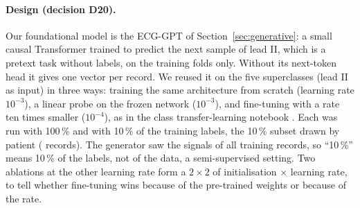 \paragraph{Design (decision D20).} Our foundational model is the ECG-GPT of Section~\ref{sec:generative}:
a small causal Transformer trained to predict the next sample of lead II, which is a pretext task without
labels, on the training folds only. Without its next-token head it gives one vector per record. We reused
it on the five superclasses (lead II as input) in three ways: training the same architecture from scratch
(learning rate $10^{-3}$), a linear probe on the frozen network ($10^{-3}$), and fine-tuning with a rate
ten times smaller ($10^{-4}$), as in the class transfer-learning notebook \cite{course_nb_transfer}.
Each was run with 100\,\% and with 10\,\% of the training labels, the 10\,\% subset drawn by patient
(\transferNTrainFinetuneFOneZero{} records). The generator saw the signals of all training records, so
``10\,\%'' means 10\,\% of the labels, not of the data, a semi-supervised setting. Two ablations at the
other learning rate form a $2 \times 2$ of initialisation $\times$ learning rate, to tell whether
fine-tuning wins because of the pre-trained weights or because of the rate.



